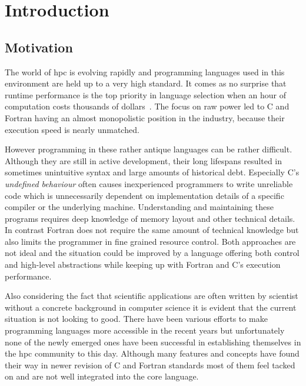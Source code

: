 \chapter{Introduction}
\label{ch:Introduction}


\section{Motivation}
\label{sec:Introduction::Motivation}

The world of \gls{hpc} is evolving rapidly and programming languages used in this environment are held up to a very high standard. It comes as no surprise that runtime performance is the top priority in language selection when an hour of computation costs thousands of dollars~\cite{cost_of_science}. The focus on raw power led to C and Fortran having an almost monopolistic position in the industry, because their execution speed is nearly unmatched.

However programming in these rather antique languages can be rather difficult. Although they are still in active development, their long lifespans resulted in sometimes unintuitive syntax and large amounts of historical debt. Especially C's \textit{undefined behaviour} often causes inexperienced programmers to write unreliable code which is unnecessarily dependent on implementation details of a specific compiler or the underlying machine. Understanding and maintaining these programs requires deep knowledge of memory layout and other technical details. In contrast Fortran does not require the same amount of technical knowledge but also limits the programmer in fine grained resource control. Both approaches are not ideal and the situation could be improved by a language offering both control and high-level abstractions while keeping up with Fortran and C's execution performance.

Also considering the fact that scientific applications are often written by scientist without a concrete background in computer science it is evident that the current situation is not looking to good. There have been various efforts to make programming languages more accessible in the recent years but unfortunately none of the newly emerged ones have been successful in establishing themselves in the \gls{hpc} community to this day. Although many features and concepts have found their way in newer revision of C and Fortran standards most of them feel tacked on and are not well integrated into the core language.

